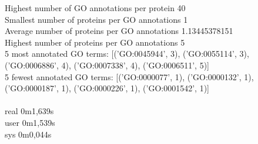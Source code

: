 \documentclass[10pt,a4paper]{article}
\begin{document}
\begin{enumerate}
{Highest number of GO annotations per protein	40\\
Smallest number of proteins per GO annotations	1\\
Average number of proteins per GO annotations	1.13445378151\\
Highest number of proteins per GO annotations	5\\
5 most annotated GO terms:	[('GO:0045944', 3), ('GO:0055114', 3), ('GO:0006886', 4), ('GO:0007338', 4), ('GO:0006511', 5)]\\
5 fewest annotated GO terms:	[('GO:0000077', 1), ('GO:0000132', 1), ('GO:0000187', 1), ('GO:0000226', 1), ('GO:0001542', 1)]\\
\\
real	0m1,639s\\
user	0m1,539s\\
sys	0m0,044s\\
}

\end{enumerate}
\end{document}
